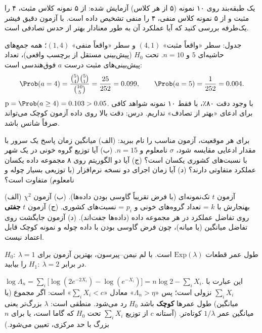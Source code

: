 \begin{exercise}
یک طبقه‌بند روی ۱۰ نمونه (۵ از هر کلاس) آزمایش شده: از ۵ نمونه کلاس مثبت، ۴ را مثبت و از ۵ نمونه کلاس منفی، ۴ را منفی تشخیص داده است. با آزمون دقیق فیشر یک‌طرفه بررسی کنید که آیا عملکرد آن به طور معنادار بهتر از حدس تصادفی است.
\end{exercise}
\begin{solution}
جدول: سطر «واقعاً مثبت» $(4,1)$ و سطر «واقعاً منفی» $(1,4)$؛ همه جمع‌های حاشیه‌ای $5$ و $n=10$. تحت $H_0$ (پیش‌بینی مستقل از برچسب واقعی)، تعداد پیش‌بینی‌های مثبت درست $a$ فوق‌هندسی است:
\[
\Prob(a=4)=\frac{\binom54\binom51}{\binom{10}5}=\frac{25}{252}=0.099,\qquad\Prob(a=5)=\frac{1}{252}=0.004 .
\]
$\text{p}=\Prob(a\ge4)=0.103>0.05$. با وجود دقت ۸۰٪، با فقط ۱۰ نمونه شواهد کافی برای ادعای «بهتر از تصادف» نداریم. درس: دقت بالا روی داده آزمون کوچک می‌تواند صرفاً شانس باشد.
\end{solution}

\begin{exercise}
برای هر موقعیت، آزمون مناسب را نام ببرید: (الف) میانگین زمان پاسخ یک سرور با مقدار ادعایی مقایسه شود، $\sigma$ نامعلوم و $n=15$. (ب) آیا توزیع گروه خونی در یک شهر با نسبت‌های کشوری یکسان است؟ (ج) آیا دو الگوریتم روی ۸ مجموعه داده یکسان عملکرد متفاوتی دارند؟ (د) آیا زمان اجرای دو نسخه نرم‌افزار (با توزیعی بسیار چوله و نامعلوم) متفاوت است؟
\end{exercise}
\begin{solution}
(الف) آزمون $t$ تک‌نمونه‌ای (با فرض تقریباً گاوسی بودن داده‌ها). (ب) آزمون $\chi^2$ بهنجارش با $k$ = تعداد گروه‌های خونی و $p_i$ = نسبت‌های کشوری. (ج) آزمون $t$ \textbf{جفتی} روی تفاضل عملکرد در هر مجموعه داده (داده‌ها جفت‌اند). (د) آزمون جایگشت روی تفاضل میانگین (یا میانه)، چون فرض گاوسی بودن با داده چوله و نمونه کوچک قابل اعتماد نیست.
\end{solution}

\begin{exercise}
طول عمر قطعات $\mathrm{Exp}(\lambda)$ است. با لم نیمن--پیرسون، بهترین آزمون برای $H_0:\ \lambda=1$ در برابر $H_1:\ \lambda=2$ را بیابید.
\end{exercise}
\begin{solution}
$\log\Lambda_n=\sum_i\big[\log(2e^{-2X_i})-\log(e^{-X_i})\big]=n\log2-\sum_iX_i$. این عبارت با $\sum_iX_i$ نزولی است؛ پس «$\Lambda_n>\eta$» معادل «$\sum_iX_i<c$» است: اگر مجموع (یا میانگین) طول عمرها \textbf{کوچک} باشد $H_0$ رد می‌شود. منطقی است: $\lambda$ بزرگ‌تر یعنی میانگین عمر $1/\lambda$ کوتاه‌تر. (آستانه $c$ از توزیع $\sum_iX_i$ تحت $H_0$ که گاما است، یا برای $n$ بزرگ با حد مرکزی، تعیین می‌شود.)
\end{solution}
